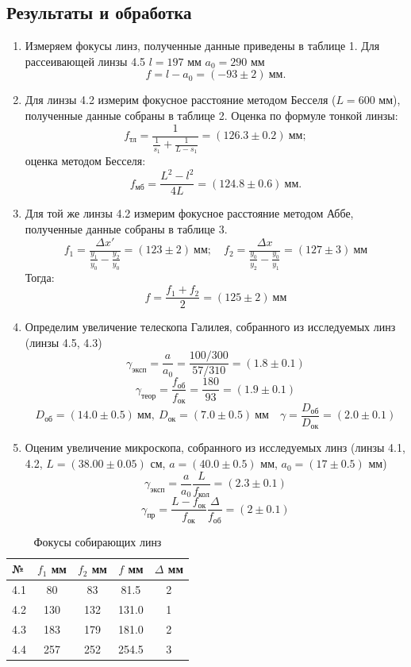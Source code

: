 \documentclass[12pt]{article}
\begin{document}
    \subsection*{Результаты и обработка}
    \begin{enumerate}
        \item Измеряем фокусы линз, полученные данные приведены в таблице 1.
        Для рассеивающей линзы 4.5 $l = 197$ мм $a_0=290$  мм
        \[f = l - a_0 = (-93\pm 2)\ \text{мм}.\]

        \item Для линзы 4.2 измерим фокусное расстояние методом Бесселя ($L = 600$ мм), полученные данные собраны в таблице 2.
        Оценка по формуле тонкой линзы:
        \[f_{\text{тл}} = \frac{1}{\frac{1}{s_1} + \frac{1}{L - s_1}} = (126.3 \pm 0.2)\ \text{мм};\]
        оценка методом Бесселя:
        \[f_{\text{мб}} = \frac{L^2 - l^2}{4L} = (124.8 \pm 0.6)\ \text{мм}.\]

        \item Для той же линзы 4.2 измерим фокусное расстояние методом Аббе, полученные данные собраны в таблице 3.
        \[f_1 = \frac{\Delta x'}{\frac{y_1}{y_0} - \frac{y_2}{y_0}} = (123 \pm 2)\ \text{мм};
        \quad f_2 = \frac{\Delta x}{\frac{y_0}{y_2} - \frac{y_0}{y_1}} = (127 \pm 3)\ \text{мм}\]
        Тогда:
        \[f = \frac{f_1 + f_2}{2} = (125 \pm 2)\ \text{мм}\]

        \item Определим увеличение телескопа Галилея, собранного из исследуемых линз (линзы 4.5, 4.3)
        \[\gamma_{\text{эксп}} = \frac{a}{a_0} = \frac{100/300}{57/310} = (1.8\pm0.1)\]
        \[\gamma_{\text{теор}} = \frac{f_{\text{об}}}{f_{\text{ок}}} = \frac{180}{93} = (1.9\pm0.1)\]
        \[D_{\text{об}} = (14.0\pm0.5)\ \text{мм},\ D_{\text{ок}} = (7.0\pm0.5)\ \text{мм}
        \quad \gamma = \frac{D_{\text{об}}}{D_{\text{ок}}} = (2.0 \pm0.1)\]

        \item Оценим увеличение микроскопа, собранного из исследуемых линз (линзы 4.1, 4.2, $L = (38.00\pm0.05)$ см,
        $a = (40.0\pm0.5)$ мм, $a_0 = (17\pm0.5)$ мм)
        \[\gamma_{\text{эксп}} = \frac{a}{a_0} \frac{L}{f_{\text{кол}}} = (2.3\pm0.1)\]
        \[\gamma_{\text{пр}} = \frac{L - f_{\text{ок}}}{f_{\text{ок}}}\frac{\Delta}{f_{\text{об}}} = (2\pm0.1)\]
    \end{enumerate}
    \begin{table}[b]
        \centering
        \caption{Фокусы собирающих линз}
        \label{tab:1}
        \begin{tabular}{|lcccc|}
            \hline
            №   & $f_1$ мм & $f_2$ мм & $f$ мм & $\Delta$ мм \\\hline
            4.1 & 80       & 83       & 81.5   & 2           \\
            4.2 & 130      & 132      & 131.0  & 1           \\
            4.3 & 183      & 179      & 181.0  & 2           \\
            4.4 & 257      & 252      & 254.5  & 3           \\\hline
        \end{tabular}
    \end{table}
\end{document}
